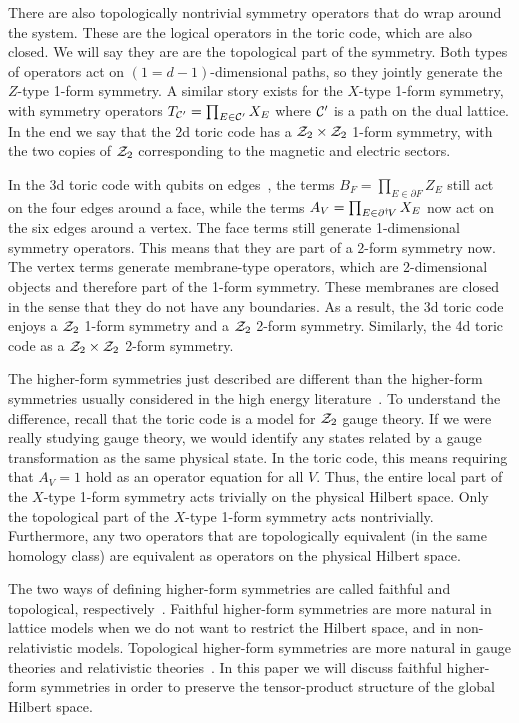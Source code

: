 There are also topologically nontrivial symmetry operators that do wrap around the system. These are the logical operators in the toric code, which are also closed. We will say they are are the topological part of the symmetry. Both types of operators act on $(1=d-1)$-dimensional paths, so they jointly generate the $Z$-type 1-form symmetry. A similar story exists for the $X$-type 1-form symmetry, with symmetry operators $T_{\cal C'} = \prod_{E\in \cal C'}X_E$ where $\cal C'$ is a path on the dual lattice. In the end we say that the 2d toric code has a $\Z_2\times\Z_2$ 1-form symmetry, with the two copies of $\Z_2$ corresponding to the magnetic and electric sectors.

In the 3d toric code with qubits on edges~\cite{CastelnovoChamon2008}, the terms $B_F = \prod_{E \in \partial F} Z_E$ still act on the four edges around a face, while the terms $A_V = \prod_{E\in\pardag V} X_E$ now act on the six edges around a vertex.
The face terms still generate 1-dimensional symmetry operators. This means that they are part of a 2-form symmetry now. The vertex terms generate membrane-type operators, which are 2-dimensional objects and therefore part of the 1-form symmetry. These membranes are closed in the sense that they do not have any boundaries. As a result, the 3d toric code enjoys a $\Z_2$ 1-form symmetry and a $\Z_2$ 2-form symmetry. Similarly, the 4d toric code as a $\Z_2\times\Z_2$ 2-form symmetry. 

The higher-form symmetries just described are different than the higher-form symmetries usually considered in the high energy literature~\cite{Seiberg2020Field, Qi2021Exotic}. To understand the difference, recall that the toric code is a model for $\Z_2$ gauge theory. If we were really studying gauge theory, we would identify any states related by a gauge transformation as the same physical state. In the toric code, this means requiring that $A_V=1$ hold as an operator equation for all $V$. Thus, the entire local part of the $X$-type 1-form symmetry acts trivially on the physical Hilbert space. Only the topological part of the $X$-type 1-form symmetry acts nontrivially. Furthermore, any two operators that are topologically equivalent (in the same homology class) are equivalent as operators on the physical Hilbert space.

The two ways of defining higher-form symmetries are called faithful and topological, respectively~\cite{Qi2021Exotic}. Faithful higher-form symmetries are more natural in lattice models when we do not want to restrict the Hilbert space, and in non-relativistic models. Topological higher-form symmetries are more natural in gauge theories and relativistic theories~\cite{Seiberg2020Field}.  In this paper we will discuss faithful higher-form symmetries in order to preserve the tensor-product structure of the global Hilbert space.

